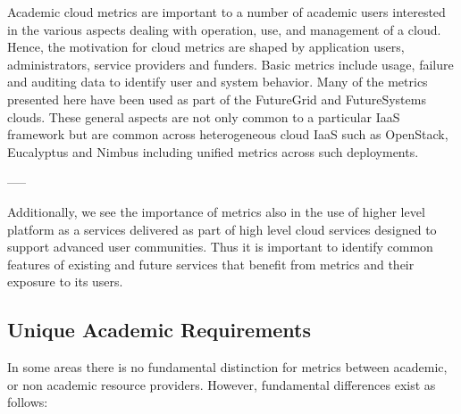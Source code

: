 \documentclass{sig-alternate-05-2015}
\begin{document}
Academic cloud metrics are important to a number of academic users interested in the various aspects dealing with  operation, use, and management of a cloud. Hence, the motivation for cloud metrics are shaped by application users, administrators, service providers and funders. Basic metrics include usage, failure and auditing data to identify user and system behavior. Many of the metrics presented here have been used as part of the FutureGrid and FutureSystems clouds. These general aspects are not only common to a particular IaaS framework but are common across heterogeneous cloud IaaS such as OpenStack, Eucalyptus and Nimbus including unified metrics across such deployments.  


-----

Additionally, we see the importance of metrics also in the use of higher level platform as a services delivered as part of high level cloud services designed to support  advanced user communities. Thus it is important to identify common features of existing and future services that benefit from metrics and their exposure to its users. 

\subsection{Unique Academic Requirements}

In some areas there is no fundamental distinction for metrics between academic, or non academic resource providers. However, fundamental differences exist as follows:

\begin{description}

\item 

\item

\item

\end{description}
\end{document}
